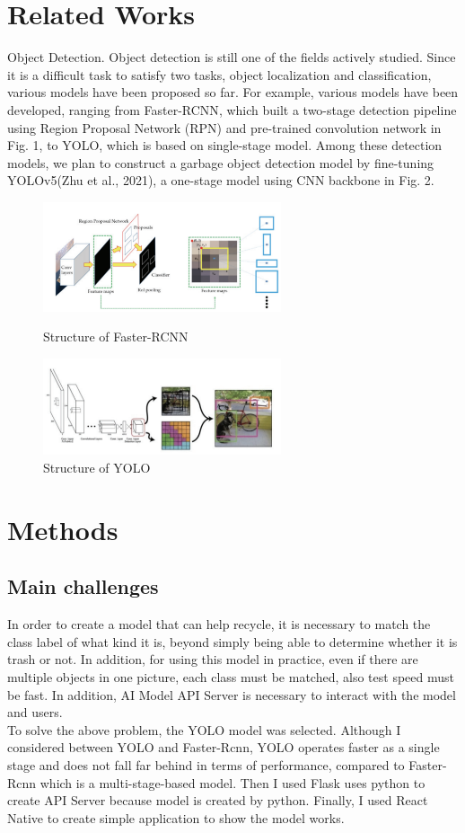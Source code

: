 \documentclass{article}
\begin{document}
\section{Related Works}
{Object Detection. Object detection is still one of the fields actively studied. Since it is a difficult task to satisfy two tasks, object localization and classification, various models have been proposed so far. For example, various models have been developed, ranging from Faster-RCNN\cite{rcnn}, which built a two-stage detection pipeline using Region Proposal Network (RPN) and pre-trained convolution network in Fig. 1, to YOLO\cite{yolo}, which is based on single-stage model. Among these detection models, we plan to construct a garbage object detection model by fine-tuning YOLOv5(Zhu et al., 2021), a one-stage model using CNN backbone in Fig. 2.
}\\
\begin{figure}
\centering
\includegraphics[width=7cm]{Final_Project/image/f-rcnn.png}
\caption{Structure of Faster-RCNN}
\includegraphics[width=7cm]{Final_Project/image/yolo structure.png}
\caption{Structure of YOLO }
\end{figure}
\section{Methods}
\subsection{Main challenges}
{In order to create a model that can help recycle, it is necessary to match the class label of what kind it is, beyond simply being able to determine whether it is trash or not. In addition, for using this model in practice, even if there are multiple objects in one picture, each class must be matched, also test speed must be fast. In addition, AI Model API Server is necessary to interact with the model and users.}\\
{To solve the above problem, the YOLO model was selected. Although I considered between YOLO and Faster-Rcnn, YOLO operates faster as a single stage and does not fall far behind in terms of performance, compared to Faster-Rcnn which is a multi-stage-based model.\cite{compare} Then I used Flask uses python to create API Server because model is created by python. Finally,  I used React Native to create simple application to show the model works.
}\\
\end{document}

